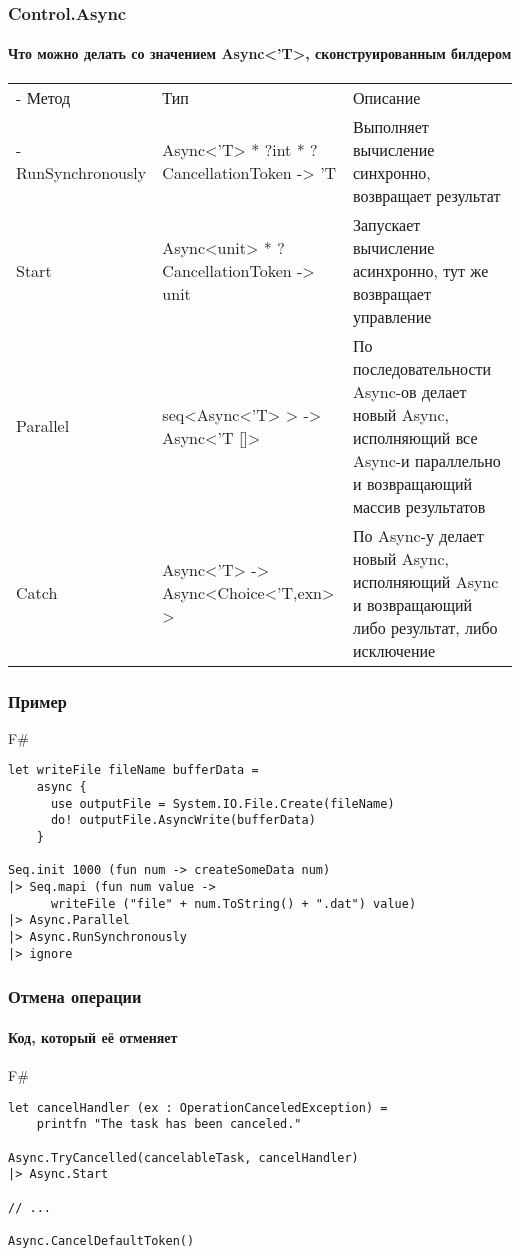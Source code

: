 \documentclass[xetex,mathserif,serif]{beamer}
\begin{document}
		\begin{frame}
		\frametitle{Control.Async}
		\framesubtitle{Что можно делать со значением Async<'T>, сконструированным билдером}
		\begin{footnotesize}
			\begin{tabu} {| X[0.7 l p] | X[1 l p] | X[1 l p] |}
				\tabucline-
				Метод              & Тип                                         & Описание           \\
				\tabucline-
				\everyrow{\tabucline-}
				RunSynchronously   & Async<'T> * ?int * ?CancellationToken -> 'T & Выполняет вычисление синхронно, возвращает результат \\
				Start              & Async<unit> * ?CancellationToken -> unit    & Запускает вычисление асинхронно, тут же возвращает управление \\
				Parallel           & seq<Async<'T> > -> Async<'T []>             & По последовательности Async-ов делает новый Async, исполняющий все Async-и параллельно и возвращающий массив результатов \\
				Catch              & Async<'T> -> Async<Choice<'T,exn> >         & По Async-у делает новый Async, исполняющий Async и возвращающий либо результат, либо исключение \\
   			\end{tabu}
		\end{footnotesize}
	\end{frame}
	
	\begin{frame}[fragile]
		\frametitle{Пример}
   		\begin{exampleblock}{F\#}
   			\begin{lstlisting}
let writeFile fileName bufferData =
    async {
      use outputFile = System.IO.File.Create(fileName)
      do! outputFile.AsyncWrite(bufferData) 
    }

Seq.init 1000 (fun num -> createSomeData num)
|> Seq.mapi (fun num value -> 
      writeFile ("file" + num.ToString() + ".dat") value)
|> Async.Parallel
|> Async.RunSynchronously
|> ignore
\end{lstlisting}
\end{exampleblock}
\end{frame}	

	\begin{frame}[fragile]
		\frametitle{Отмена операции}
		\framesubtitle{Код, который её отменяет}
   		\begin{exampleblock}{F\#}
   			\begin{lstlisting}
let cancelHandler (ex : OperationCanceledException) =
    printfn "The task has been canceled."

Async.TryCancelled(cancelableTask, cancelHandler)
|> Async.Start

// ...

Async.CancelDefaultToken()
\end{lstlisting}
\end{exampleblock}
\end{frame}
\end{document}

